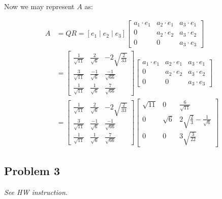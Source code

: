 \documentclass[11pt]{article}
\providecommand{\qbm}[1]{\begin{bmatrix} #1 \end{bmatrix}}
\begin{document}
Now we may represent $A$ as:

\begin{align*}
    A &= QR = [e_1 \mid e_2 \mid e_3] \qbm{a_1 \cdot e_1 & a_2 \cdot e_1 & a_3 \cdot e_1 \\ 0 & a_2 \cdot e_2 & a_3 \cdot e_2 \\
    0 & 0 & a_3 \cdot e_3} \\
    &= \qbm{\frac{1}{\sqrt{11}} & \frac{2}{\sqrt{6}} & -2 \sqrt{\frac{2}{33}} \\
    \frac{3}{\sqrt{11}} & \frac{-1}{\sqrt{6}} &\frac{-1}{\sqrt{66}} \\
    \frac{1}{\sqrt{11}} & \frac{1}{\sqrt{6}} &\frac{7}{\sqrt{66}}} \qbm{a_1 \cdot e_1 & a_2 \cdot e_1 & a_3 \cdot e_1 \\ 0 & a_2 \cdot e_2 & a_3 \cdot e_2 \\
    0 & 0 & a_3 \cdot e_3} \\
    &= \qbm{\frac{1}{\sqrt{11}} & \frac{2}{\sqrt{6}} & -2 \sqrt{\frac{2}{33}} \\
    \frac{3}{\sqrt{11}} & \frac{-1}{\sqrt{6}} &\frac{-1}{\sqrt{66}} \\
    \frac{1}{\sqrt{11}} & \frac{1}{\sqrt{6}} &\frac{7}{\sqrt{66}}} \qbm{\sqrt{11} & 0 & \frac{6}{\sqrt{11}} \\
    0 & \sqrt{6} & 2\sqrt{\frac{2}{3}} - \frac{1}{\sqrt{6}}\\
    0 & 0 & 3\sqrt{\frac{3}{22}}}
\end{align*}





\subsection*{Problem 3}
\textit{See HW instruction.}\newline
\end{document}

